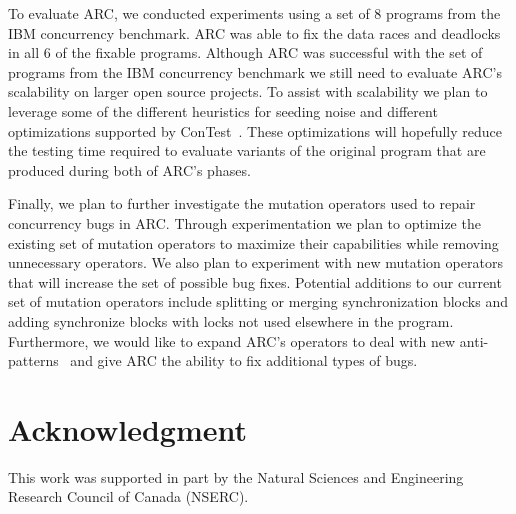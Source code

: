 \documentclass[runningheads,a4paper]{llncs}
\begin{document}
To evaluate ARC, we conducted experiments  using a set of 8 programs from the IBM concurrency benchmark. ARC was able to fix the data races and deadlocks in all 6 of the fixable programs. Although ARC was successful with the set of programs from the IBM concurrency benchmark we still need to evaluate ARC's scalability on larger open source projects. To assist with scalability we plan to leverage some of the different heuristics for seeding noise and different optimizations supported by ConTest~\cite{KLVU10}. These optimizations will hopefully reduce the testing time required to evaluate variants of the original program that are produced during both of ARC's phases.

Finally, we plan to further investigate the mutation operators used to repair concurrency bugs in ARC. Through experimentation we plan to optimize the existing set of mutation operators to maximize their capabilities while removing unnecessary operators.  We also plan to experiment with new mutation operators that will increase the set of possible bug fixes. Potential additions to our current set of mutation operators include splitting or merging synchronization blocks and adding synchronize blocks with locks not used elsewhere in the program. Furthermore, we would like to expand ARC's operators to deal with new anti-patterns~\cite{BJ09, FKLV12} and give ARC the ability to fix additional types of bugs. 

\section*{Acknowledgment}

This work was supported in part by the Natural Sciences and Engineering Research Council of Canada (NSERC). 



\end{document}
